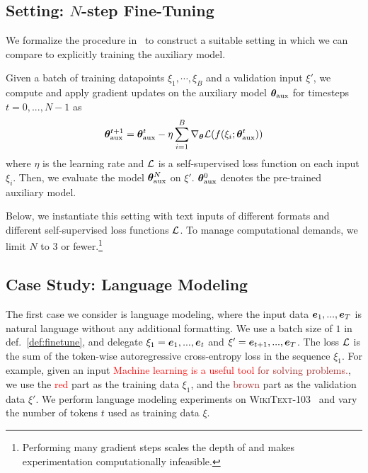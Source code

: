 \subsection{Setting: $N$-step Fine-Tuning}
We formalize the procedure in~ to construct a suitable setting in which we can compare \simulator{} to explicitly training the auxiliary model.
\begin{definition}
    \label{def:finetune}
    Given a batch of training datapoints $\xi_1, \cdots, \xi_B$ and a validation input $\xi'$, we compute and apply gradient updates on the auxiliary model ${\bm{\theta}}_{\text{aux}}$ for timesteps $t=0,...,N-1$ as
    $$ {\bm{\theta}}_{\text{aux}}^{t+1} = {\bm{\theta}}_{\text{aux}}^t - \eta \sum_{i=1}^{B} \nabla_{\bm{\theta}} \mathcal{L}(f(\xi_i; {\bm{\theta}}_{\text{aux}}^t)) $$
    where $\eta$ is the learning rate and $\mathcal{L}$ is a self-supervised loss function on each input $\xi_i$.
    Then, we evaluate the model ${\bm{\theta}}_{\text{aux}}^N$ on $\xi'$.
    ${\bm{\theta}}_{\text{aux}}^0$ denotes the pre-trained auxiliary model.
\end{definition}

Below, we instantiate this setting with text inputs of different formats and different self-supervised loss functions $\mathcal{L}$. 
To manage computational demands, we limit $N$ to $3$ or fewer.\footnote{Performing many gradient steps scales the depth of \simulator{} and makes experimentation computationally infeasible.} 


\subsection{Case Study: Language Modeling}\label{setting:lm}



The first case we consider is language modeling, where the input data $\ve_1,...,\ve_T$ is natural language without any additional formatting. 
We use a batch size of $1$ in def.~\ref{def:finetune}, and delegate $\xi_1=\ve_1,...,\ve_t$ and $\xi'=\ve_{t+1},...,\ve_T$. 
The loss $\mathcal{L}$ is the sum of the token-wise autoregressive cross-entropy loss in the sequence $\xi_1$. %
For example, given an input \textcolor{red}{Machine learning is a useful tool} \textcolor{brown}{for solving problems.}, we use the \textcolor{red}{red} part as the training data $\xi_1$, and the \textcolor{brown}{brown} part as the validation data $\xi'$. 
We perform language modeling experiments on \textsc{WikiText-103}~\citep{merity2016pointer} and vary the number of tokens $t$ used as training data $\xi$. 

